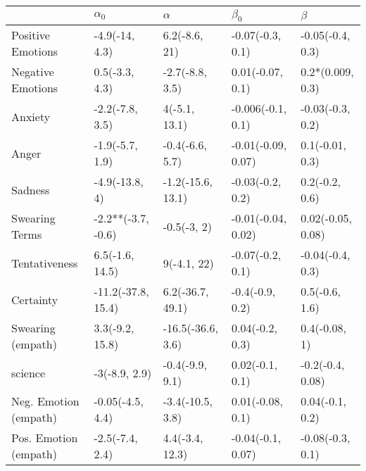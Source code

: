 \begin{tabular}{lllll}
\toprule
{} &          $\alpha_0$ &           $\alpha$ &           $\beta_0$ &            $\beta$ \\
\midrule
Positive Emotions     &      -4.9(-14, 4.3) &      6.2(-8.6, 21) &    -0.07(-0.3, 0.1) &   -0.05(-0.4, 0.3) \\
Negative Emotions     &      0.5(-3.3, 4.3) &    -2.7(-8.8, 3.5) &    0.01(-0.07, 0.1) &   0.2*(0.009, 0.3) \\
Anxiety               &     -2.2(-7.8, 3.5) &      4(-5.1, 13.1) &   -0.006(-0.1, 0.1) &   -0.03(-0.3, 0.2) \\
Anger                 &     -1.9(-5.7, 1.9) &    -0.4(-6.6, 5.7) &  -0.01(-0.09, 0.07) &    0.1(-0.01, 0.3) \\
Sadness               &      -4.9(-13.8, 4) &  -1.2(-15.6, 13.1) &    -0.03(-0.2, 0.2) &     0.2(-0.2, 0.6) \\
Swearing Terms        &  -2.2**(-3.7, -0.6) &        -0.5(-3, 2) &  -0.01(-0.04, 0.02) &  0.02(-0.05, 0.08) \\
Tentativeness         &     6.5(-1.6, 14.5) &        9(-4.1, 22) &    -0.07(-0.2, 0.1) &   -0.04(-0.4, 0.3) \\
Certainty             &  -11.2(-37.8, 15.4) &   6.2(-36.7, 49.1) &     -0.4(-0.9, 0.2) &     0.5(-0.6, 1.6) \\
Swearing (empath)     &     3.3(-9.2, 15.8) &  -16.5(-36.6, 3.6) &     0.04(-0.2, 0.3) &      0.4(-0.08, 1) \\
science               &       -3(-8.9, 2.9) &    -0.4(-9.9, 9.1) &     0.02(-0.1, 0.1) &   -0.2(-0.4, 0.08) \\
Neg. Emotion (empath) &    -0.05(-4.5, 4.4) &   -3.4(-10.5, 3.8) &    0.01(-0.08, 0.1) &    0.04(-0.1, 0.2) \\
Pos. Emotion (empath) &     -2.5(-7.4, 2.4) &    4.4(-3.4, 12.3) &   -0.04(-0.1, 0.07) &   -0.08(-0.3, 0.1) \\
\bottomrule
\end{tabular}
